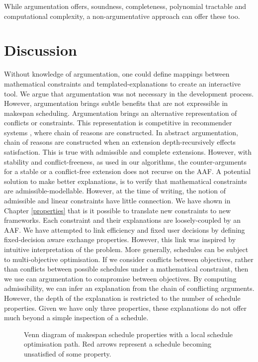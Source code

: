 While argumentation offers, soundness, completeness, polynomial tractable and computational complexity, a non-argumentative approach can offer these too.

\section{Discussion}

Without knowledge of argumentation, one could define mappings between mathematical constraints and templated-explanations to create an interactive tool. We argue that argumentation was not necessary in the development process. However, argumentation brings subtle benefits that are not expressible in makespan scheduling.
\linespace
Argumentation brings an alternative representation of conflicts or constraints. This representation is competitive in recommender systems \cite{recommend}, where chain of reasons are constructed. In abstract argumentation, chain of reasons are constructed when an extension depth-recursively effects satisfaction. This is true with admissible and complete extensions. However, with stability and conflict-freeness, as used in our algorithms, the counter-arguments for a stable or a conflict-free extension does not recurse on the AAF. A potential solution to make better explanations, is to verify that mathematical constraints are admissible-modellable. However, at the time of writing, the notion of admissible and linear constraints have little connection. 
\linespace
We have shown in Chapter \ref{properties} that is it possible to translate new constraints to new frameworks. Each constraint and their explanations are loosely-coupled by an AAF. We have attempted to link efficiency and fixed user decisions by defining fixed-decision aware exchange properties. However, this link was inspired by intuitive interpretation of the problem. More generally, schedules can be subject to multi-objective optimisation. If we consider conflicts between objectives, rather than conflicts between possible schedules under a mathematical constraint, then we use can argumentation to compromise between objectives. By computing admissibility, we can infer an explanation from the chain of conflicting arguments. However, the depth of the explanation is restricted to the number of schedule properties. Given we have only three properties, these explanations do not offer much beyond a simple inspection of a schedule.

\begin{figure}[H]
	\label{problempath}
	
	\caption{Venn diagram of makespan schedule properties with a local schedule optimisation path. Red arrows represent a schedule becoming unsatisfied of some property.}
\end{figure}

